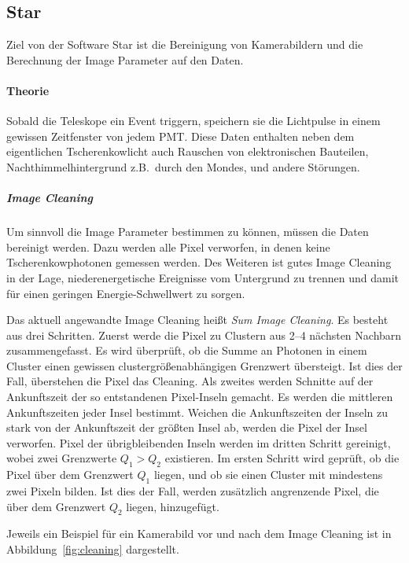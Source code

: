 \subsection{Star}%
\label{sub:star}
Ziel von der Software Star ist die Bereinigung von Kamerabildern und die Berechnung
der Image Parameter auf den Daten.

\paragraph{Theorie}
Sobald die Teleskope ein Event triggern,
speichern sie die Lichtpulse in einem gewissen Zeitfenster von jedem PMT.\@
Diese Daten enthalten neben dem eigentlichen Tscherenkowlicht auch
Rauschen von elektronischen Bauteilen,
Nachthimmelhintergrund  z.B.\ durch den Mondes,
und andere Störungen.

\subparagraph{Image Cleaning}
Um sinn\-voll die Im\-age Pa\-ra\-met\-er bestimmen zu können,
müssen die Daten bereinigt werden.
Dazu werden alle Pixel verworfen, in denen keine
Tscherenkowphotonen gemessen werden.
Des Weiteren ist gutes Image Cleaning in der Lage,
niederenergetische Ereignisse vom Untergrund zu trennen und damit
für einen geringen Energie-Schwellwert zu sorgen.

Das aktuell angewandte Image Cleaning heißt \textit{Sum Image Cleaning}.
Es besteht aus drei Schritten.
Zuerst werde die Pixel zu Clustern aus 2--4 nächsten Nachbarn zusammengefasst.
Es wird überprüft, ob die Summe an Photonen in einem Cluster
einen gewissen clustergrößenabhängigen Grenzwert übersteigt.
Ist dies der Fall, überstehen die Pixel das Cleaning.
Als zweites werden Schnitte auf der Ankunftszeit der so entstandenen
Pixel-Inseln gemacht.
Es werden die mittleren Ankunftszeiten jeder Insel bestimmt.
Weichen die Ankunftszeiten der Inseln zu stark von der Ankunftszeit der größten Insel ab,
werden die Pixel der Insel verworfen.
Pixel der übrigbleibenden Inseln werden im dritten Schritt gereinigt,
wobei zwei Grenzwerte $Q_{1} > Q_{2}$ existieren.
Im ersten Schritt wird geprüft,
ob die Pixel über dem
Grenzwert $Q_{1}$ liegen,
und ob sie einen Cluster mit mindestens zwei Pixeln bilden.
Ist dies der Fall,
werden zusätzlich angrenzende Pixel,
die über dem Grenzwert $Q_{2}$ liegen,
hinzugefügt.

Jeweils ein Beispiel für ein Kamerabild vor und nach dem Image Cleaning ist in
Abbildung~\ref{fig:cleaning} dargestellt.

